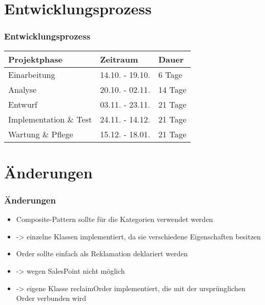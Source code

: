 \documentclass[]{tudbeamer}
\begin{document}
\section{Entwicklungsprozess}
\begin{frame}
\frametitle{Entwicklungsprozess}
\begin{tabular}{p{}|p{}|p{}}
Projektphase & Zeitraum & Dauer\\ \hline
Einarbeitung & 14.10. - 19.10. & 6 Tage\\
Analyse & 20.10. - 02.11. & 14 Tage\\
Entwurf & 03.11. - 23.11. & 21 Tage\\
Implementation \& Test & 24.11. - 14.12. & 21 Tage\\
Wartung \& Pflege & 15.12. - 18.01. & 21 Tage\\
\end{tabular}
\end{frame}

\section{Änderungen}
\begin{frame}
\frametitle{Änderungen}
\begin{itemize}
\item Composite-Pattern sollte für die Kategorien verwendet werden
\item -> einzelne Klassen implementiert, da sie verschiedene Eigenschaften besitzen
\item Order sollte einfach als Reklamation deklariert werden
\item -> wegen SalesPoint nicht möglich
\item -> eigene Klasse reclaimOrder implementiert, die mit der ursprünglichen Order verbunden wird
\end{itemize}
\end{frame}
\end{document}
